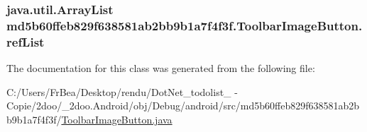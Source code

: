 \hypertarget{classmd5b60ffeb829f638581ab2bb9b1a7f4f3f_1_1_toolbar_image_button_0a2d6944fb1b2de17004833a15342f25}{
\subsubsection[{refList}]{\setlength{\rightskip}{0pt plus 5cm}java.util.ArrayList {\bf md5b60ffeb829f638581ab2bb9b1a7f4f3f.ToolbarImageButton.refList}}}
\label{classmd5b60ffeb829f638581ab2bb9b1a7f4f3f_1_1_toolbar_image_button_0a2d6944fb1b2de17004833a15342f25}




The documentation for this class was generated from the following file:\begin{CompactItemize}
\item 
C:/Users/FrBea/Desktop/rendu/DotNet\_\-todolist\_ - Copie/2doo/\_\-2doo.Android/obj/Debug/android/src/md5b60ffeb829f638581ab2bb9b1a7f4f3f/\hyperlink{_toolbar_image_button_8java}{ToolbarImageButton.java}\end{CompactItemize}
